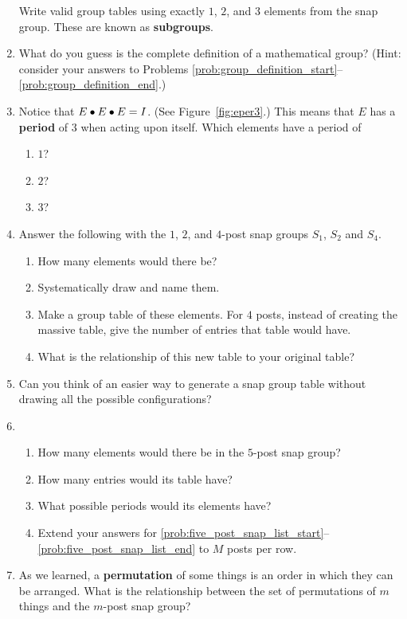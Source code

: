 \documentclass[../gatm.tex]{subfiles}
\begin{document}
\begin{enumerate}
Write valid group tables using exactly $1$, $2$, and $3$ elements from the snap group. These are known as \textbf{subgroups}.\label{prob:group_definition_end}
\item What do you guess is the complete definition of a mathematical group? (Hint: consider your answers to Problems \ref{prob:group_definition_start}--\ref{prob:group_definition_end}.)
\item Notice that $E\bullet E\bullet E=I$. (See Figure~\ref{fig:eper3}.) This means that $E$ has a \textbf{period} of $3$ when acting upon itself. Which elements have a period of \begin{multicols}{3}
\begin{enumerate}
\item $1$?
\item $2$?
\item $3$?
\end{enumerate}
\end{multicols}
\item Answer the following with the $1$, $2$, and $4$-post snap groups $S_1$, $S_2$ and $S_4$.\begin{enumerate}
\item How many elements would there be?
\item Systematically draw and name them.
\item Make a group table of these elements. For $4$ posts, instead of creating the massive table, give the number of entries that table would have.
\item What is the relationship of this new table to your original table?
\end{enumerate}
\item Can you think of an easier way to generate a snap group table without drawing all the possible configurations?
\item \begin{enumerate}
\item How many elements would there be in the $5$-post snap group? \label{prob:five_post_snap_list_start}
\item How many entries would its table have?
\item What possible periods would its elements have? \label{prob:five_post_snap_list_end}
\item Extend your answers for \ref{prob:five_post_snap_list_start}--\ref{prob:five_post_snap_list_end} to $M$ posts per row.
\end{enumerate}
\item As we learned, a \textbf{permutation} of some things is an order in which they can be arranged. What is the relationship between the set of permutations of $m$ things and the $m$-post snap group?
\end{enumerate}
\end{document}
